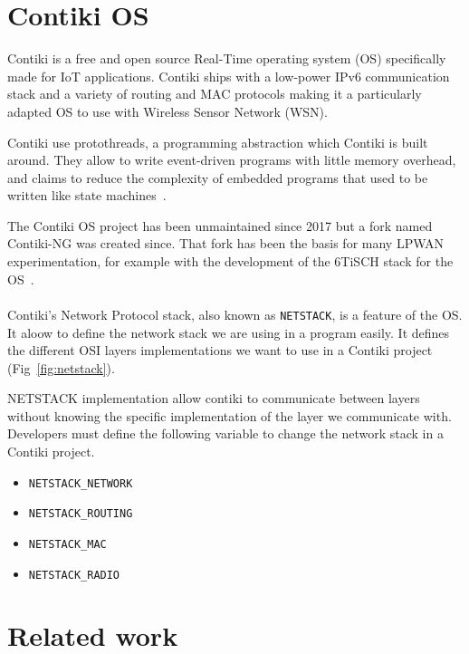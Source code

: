 \section{Contiki OS}

Contiki is a free and open source Real-Time operating system (OS) specifically made
for IoT applications. Contiki ships with a low-power IPv6 communication stack
and a variety of routing and MAC protocols making it a particularly adapted OS to
use with Wireless Sensor Network (WSN).

Contiki use protothreads, a programming abstraction which Contiki is
built around.
They allow to write event-driven programs with little memory overhead, and
claims to reduce the complexity of embedded programs that used to be written 
like state machines~\cite{10.1145/1182807.1182811}.

The Contiki OS project has been unmaintained since 2017 but a
fork named Contiki-NG was created since.
That fork has been the basis for many LPWAN experimentation, for example 
with the development of the 6TiSCH stack for the OS~\cite{Duquennoy2017TSCHA6}.

\paragraph{}

Contiki's Network Protocol stack, also known as \lstinline{NETSTACK}, is a
feature of the OS.
It aloow to define the network stack we are using in a program easily.
It defines the different OSI layers implementations we 
want to use in a Contiki project (Fig~\ref{fig:netstack}).

NETSTACK implementation allow contiki to communicate between layers without 
knowing the specific implementation of the layer we communicate with.
Developers must define the following variable to change the network stack 
in a Contiki project.

\begin{itemize}
  \item \lstinline{NETSTACK_NETWORK}
  \item \lstinline{NETSTACK_ROUTING}
  \item \lstinline{NETSTACK_MAC}
  \item \lstinline{NETSTACK_RADIO}
\end{itemize}



\section{Related work}

